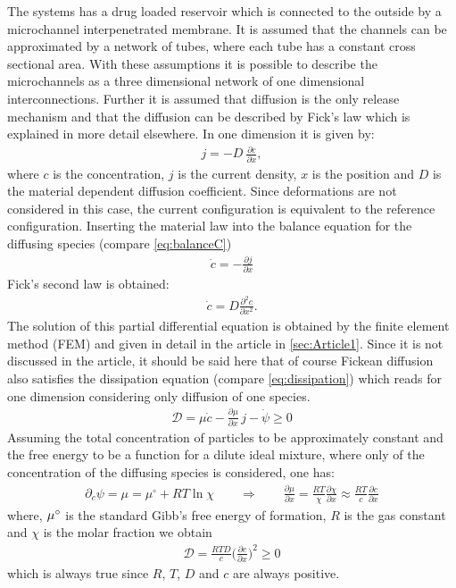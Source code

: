 The systems has a drug loaded reservoir which is connected to the outside by a microchannel interpenetrated membrane. It is assumed that the channels can be approximated by a network of tubes, where each tube has a constant cross sectional area. With these assumptions it is possible to describe the microchannels as a three dimensional network of one dimensional interconnections. Further it is assumed that diffusion is the only release mechanism and that the diffusion can be described by Fick's law which is explained in more detail elsewhere\supercite{taylor_multicomponent_1993}. In one dimension it is given by: 
\begin{align}
  j = -D \ \frac{\partial c}{\partial x},
\end{align}
where $c$ is the concentration, $j$ is the current density, $x$ is the position and $D$ is the material dependent diffusion coefficient. Since deformations are not considered in this case, the current configuration is equivalent to the reference configuration. Inserting the material law into the balance equation for the diffusing species (compare \cref{eq:balanceC})
\begin{align}
  \dot c = - \frac{\partial j}{\partial x}
\end{align}
Fick's second law is obtained: 
\begin{align}
  \dot c = D \frac{\partial^2 c}{\partial x^2}.
\end{align}
The solution of this partial differential equation is obtained by the finite element method (FEM) and given in detail in the article in \cref{sec:Article1}. Since it is not discussed in the article, it should be said here that of course Fickean diffusion also satisfies the dissipation equation (compare \cref{eq:dissipation}) which reads for one dimension considering only diffusion of one species.
\begin{align}
  \mathcal{D} = \mu \dot c - \frac{\partial \mu}{\partial x} \, j - \dot \psi \geq 0
\end{align} 
Assuming the total concentration of particles to be approximately constant and the free energy to be a function for a dilute ideal mixture, where only of the concentration of the diffusing species is considered, one has:
\begin{align}
  \partial_c \psi = \mu = \mu^{\circ} + R T \ln{\chi} \qquad \Rightarrow \qquad \frac{\partial \mu}{\partial x} = \frac{R T}{\chi} \frac{\partial \chi}{\partial x} \approx \frac{RT}{c} \frac{\partial c}{\partial x}
\end{align}
where, $\mu^{\circ}$ is the standard Gibb's free energy of formation, $R$ is the gas constant and $\chi$ is the molar fraction we obtain
\begin{align}
  \mathcal{D} = \frac{RTD}{c} \bigg(\frac{\partial c}{\partial x}\bigg)^2 \geq 0
\end{align}
which is always true since $R$, $T$, $D$ and $c$ are always positive.


